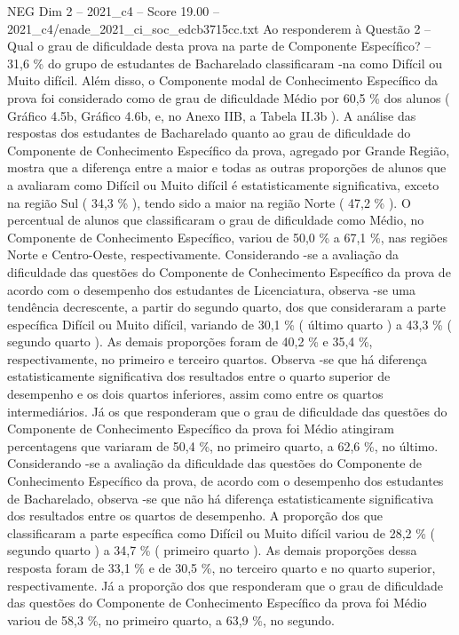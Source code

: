 \begin{textsample}{NEG Dim 2 – 2021\_c4 – Score 19.00 – 2021\_c4/enade\_2021\_ci\_soc\_edcb3715cc.txt}
Ao responderem à Questão 2 – Qual o grau de dificuldade desta prova na parte de Componente Específico? – 31,6 \% do grupo de estudantes de Bacharelado classificaram -na como Difícil ou Muito difícil.
Além disso, o Componente modal de Conhecimento Específico da prova foi considerado como de grau de dificuldade Médio por 60,5 \% dos alunos ( Gráfico 4.5b, Gráfico 4.6b, e, no Anexo IIB, a Tabela II.3b ).
A análise das respostas dos estudantes de Bacharelado quanto ao grau de dificuldade do Componente de Conhecimento Específico da prova, agregado por Grande Região, mostra que a diferença entre a maior e todas as outras proporções de alunos que a avaliaram como Difícil ou Muito difícil é estatisticamente significativa, exceto na região Sul ( 34,3 \% ), tendo sido a maior na região Norte ( 47,2 \% ).
O percentual de alunos que classificaram o grau de dificuldade como Médio, no Componente de Conhecimento Específico, variou de 50,0 \% a 67,1 \%, nas regiões Norte e Centro-Oeste, respectivamente.
Considerando -se a avaliação da dificuldade das questões do Componente de Conhecimento Específico da prova de acordo com o desempenho dos estudantes de Licenciatura, observa -se uma tendência decrescente, a partir do segundo quarto, dos que consideraram a parte específica Difícil ou Muito difícil, variando de 30,1 \% ( último quarto ) a 43,3 \% ( segundo quarto ).
As demais proporções foram de 40,2 \% e 35,4 \%, respectivamente, no primeiro e terceiro quartos.
Observa -se que há diferença estatisticamente significativa dos resultados entre o quarto superior de desempenho e os dois quartos inferiores, assim como entre os quartos intermediários.
Já os que responderam que o grau de dificuldade das questões do Componente de Conhecimento Específico da prova foi Médio atingiram percentagens que variaram de 50,4 \%, no primeiro quarto, a 62,6 \%, no último.
Considerando -se a avaliação da dificuldade das questões do Componente de Conhecimento Específico da prova, de acordo com o desempenho dos estudantes de Bacharelado, observa -se que não há diferença estatisticamente significativa dos resultados entre os quartos de desempenho.
A proporção dos que classificaram a parte específica como Difícil ou Muito difícil variou de 28,2 \% ( segundo quarto ) a 34,7 \% ( primeiro quarto ).
As demais proporções dessa resposta foram de 33,1 \% e de 30,5 \%, no terceiro quarto e no quarto superior, respectivamente.
Já a proporção dos que responderam que o grau de dificuldade das questões do Componente de Conhecimento Específico da prova foi Médio variou de 58,3 \%, no primeiro quarto, a 63,9 \%, no segundo.

\end{textsample}
